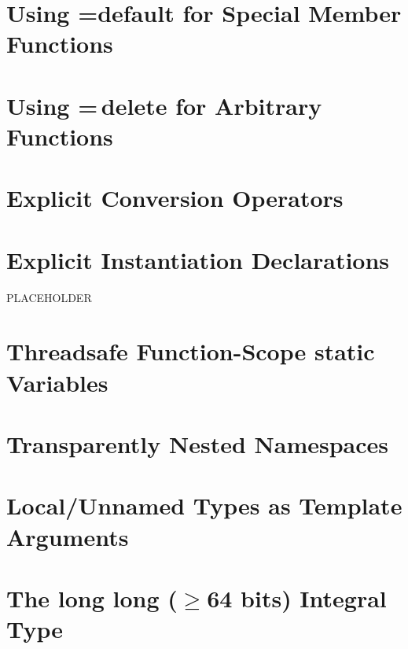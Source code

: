 \newpage
\section[Defaulted Functions]{Using {\SecCode =default} for Special Member Functions}\label{Defaulted-Special-Member-Functions}\label{defaulted-special-member-functions}


\newpage
\section[Deleted Functions]{Using {\SecCode =}\,{\SecCode delete} for Arbitrary Functions}\label{deleted-functions}


\newpage
\section[{\tt explicit} Operators]{Explicit Conversion Operators}\label{explicit-conversion-operators}


\newpage
\section[{\tt extern} {\tt template}]{Explicit Instantiation Declarations}%
% 
PLACEHOLDER

\newpage
\section[Function {\tt static} '11]{Threadsafe Function-Scope {\SecCode static} Variables}\label{thread-safe-function-static-variables}
 


\newpage
\section[{\tt inline} {\tt namespace}]{Transparently Nested Namespaces}\label{inline-namespaces}%


\newpage
\section[Local Types '11]{Local/Unnamed Types as Template Arguments}\label{local-types-as-template-arguments}


\newpage
\section[{\tt long} {\tt long}]{The {\SecCode long} {\SecCode long} ($\geq$64 bits) Integral Type}\label{long-long}


